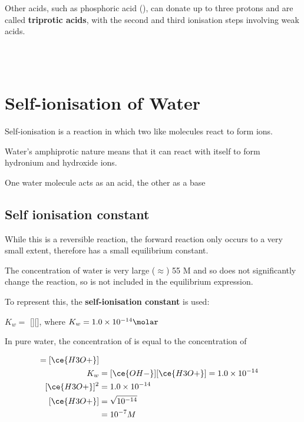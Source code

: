 		Other acids, such as phosphoric acid (), can donate up to three protons and are called \textbf{triprotic acids}, with the second and third ionisation steps involving weak acids.

		\begin{center}
			 \\
			 \\
		\end{center}

\section{Self-ionisation of Water} \label{20/02/2025}

	Self-ionisation is a reaction in which two like molecules react to form ions.

	Water's amphiprotic nature means that it can react with itself to form hydronium and hydroxide ions.

	\begin{center}
	\end{center}

	One water molecule acts as an acid, the other as a base

	\subsection{Self ionisation constant}
	
		While this is a reversible reaction, the forward reaction only occurs to a very small extent, therefore has a small equilibrium constant.

		The concentration of water is very large ($\approx$) 55 M and so does not significantly change the reaction, so  is not included in the equilibrium expression.

		To represent this, the \textbf{self-ionisation constant} is used:

		\begin{center}
			$K_w =$ [][], where $K_w = 1.0 \times 10^{-14} \si{\molar}$
		\end{center}
		
		In pure water, the concentration of  is equal to the concentration of 

		\begin{align*}
			[\ce{OH-}] = [\ce{H3O+}] \\
			K_w &= [\ce{OH-}][\ce{H3O+}] = 1.0 \times 10^{-14} \\
			[\ce{H3O+}]^2 &= 1.0 \times 10^{-14} \\
			[\ce{H3O+}] &= \sqrt{10^{-14}} \\
				    &= 10^{-7} M
		\end{align*}

